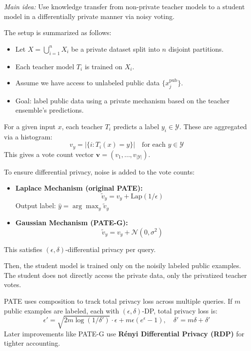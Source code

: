 \documentclass[11pt, a4paper]{article}
\begin{document}
\textit{Main idea:} Use knowledge transfer from non-private teacher models to a student model in a differentially private manner via noisy voting.

The setup is summarized as follows:
\begin{itemize}
    \item Let \( X = \bigcup_{i=1}^n X_i \) be a private dataset split into \( n \) disjoint partitions.
    \item Each teacher model \( T_i \) is trained on \( X_i \).
    \item Assume we have access to unlabeled public data \( \{x_j^{\text{pub}}\} \).
    \item Goal: label public data using a private mechanism based on the teacher ensemble’s predictions.
\end{itemize}

For a given input \( x \), each teacher \( T_i \) predicts a label \( y_i \in \mathcal{Y} \).
These are aggregated via a histogram:
\[
v_y = |\{i : T_i(x) = y\}| \quad \text{for each } y \in \mathcal{Y}
\]
This gives a vote count vector \( \mathbf{v} = (v_1, \dots, v_{|\mathcal{Y}|}) \).

To ensure differential privacy, noise is added to the vote counts:
\begin{itemize}
    \item \textbf{Laplace Mechanism (original PATE):}
    \[
    \tilde{v}_y = v_y + \text{Lap}(1/\epsilon)
    \]
    Output label: \( \hat{y} = \arg\max_y \tilde{v}_y \)

    \item \textbf{Gaussian Mechanism (PATE-G):}
    \[
    \tilde{v}_y = v_y + \mathcal{N}(0, \sigma^2)
    \]
\end{itemize}
This satisfies \((\epsilon, \delta)\)-differential privacy per query.

Then, the student model is trained only on the noisily labeled public examples.
The student does not directly access the private data, only the privatized teacher votes.

PATE uses composition to track total privacy loss across multiple queries. If \( m \) public examples are labeled, each with \((\epsilon, \delta)\)-DP, total privacy loss is:
\[
\epsilon' = \sqrt{2m \log(1/\delta')} \cdot \epsilon + m\epsilon(e^\epsilon - 1), \quad \delta' = m\delta + \delta'
\]
Later improvements like PATE-G use \textbf{Rényi Differential Privacy (RDP)} for tighter accounting.
\end{document}
